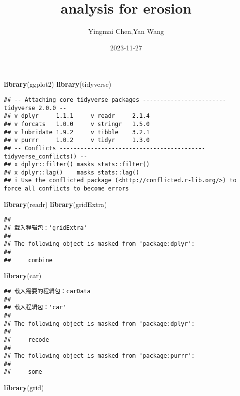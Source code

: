 \documentclass[
]{article}
\title{analysis for erosion}
\author{Yingmai Chen,Yan Wang}
\date{2023-11-27}
\newenvironment{Shaded}{\begin{snugshade}}{\end{snugshade}}
\newcommand{\FunctionTok}[1]{\textcolor[rgb]{0.13,0.29,0.53}{\textbf{#1}}}
\newcommand{\NormalTok}[1]{#1}
\begin{document}
\maketitle

\begin{Shaded}
\begin{Highlighting}[]
\FunctionTok{library}\NormalTok{(ggplot2)}
\FunctionTok{library}\NormalTok{(tidyverse)}
\end{Highlighting}
\end{Shaded}

\begin{verbatim}
## -- Attaching core tidyverse packages ------------------------ tidyverse 2.0.0 --
## v dplyr     1.1.1     v readr     2.1.4
## v forcats   1.0.0     v stringr   1.5.0
## v lubridate 1.9.2     v tibble    3.2.1
## v purrr     1.0.2     v tidyr     1.3.0
## -- Conflicts ------------------------------------------ tidyverse_conflicts() --
## x dplyr::filter() masks stats::filter()
## x dplyr::lag()    masks stats::lag()
## i Use the conflicted package (<http://conflicted.r-lib.org/>) to force all conflicts to become errors
\end{verbatim}

\begin{Shaded}
\begin{Highlighting}[]
\FunctionTok{library}\NormalTok{(readr)}
\FunctionTok{library}\NormalTok{(gridExtra)}
\end{Highlighting}
\end{Shaded}

\begin{verbatim}
## 
## 载入程辑包：'gridExtra'
## 
## The following object is masked from 'package:dplyr':
## 
##     combine
\end{verbatim}

\begin{Shaded}
\begin{Highlighting}[]
\FunctionTok{library}\NormalTok{(car)}
\end{Highlighting}
\end{Shaded}

\begin{verbatim}
## 载入需要的程辑包：carData
## 
## 载入程辑包：'car'
## 
## The following object is masked from 'package:dplyr':
## 
##     recode
## 
## The following object is masked from 'package:purrr':
## 
##     some
\end{verbatim}

\begin{Shaded}
\begin{Highlighting}[]
\FunctionTok{library}\NormalTok{(grid)}
\end{Highlighting}
\end{Shaded}
\end{document}
